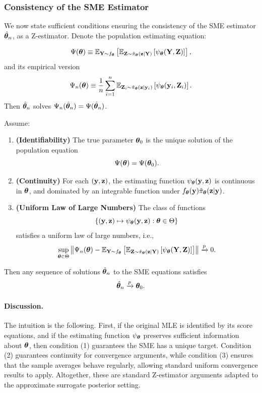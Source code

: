 \documentclass[twoside,11pt]{article}
\begin{document}
{\color{red}
\subsubsection{Consistency of the SME Estimator}

We now state sufficient conditions ensuring the consistency of the SME estimator $\hat{{\bm{\theta}}}_n$, as a Z-estimator. Denote the population estimating equation:

\begin{equation}
    \Psi({\bm{\theta}}) \equiv 
    \mathbb{E}_{{\bf Y} \sim f_{\bm{\theta}}}
    \left[
    \mathbb{E}_{{\bf Z} \sim \tilde\pi_{\bm{\theta}}({\bf z} \mid {\bf Y})}
    \left[
    \psi_{\bm{\theta}}({\bf Y}, {\bf Z})
    \right]
    \right],
\end{equation}
%
and its empirical version
%
\begin{equation}
    \Psi_n({\bm{\theta}}) \equiv 
    \frac{1}{n} \sum_{i=1}^n 
    \mathbb{E}_{{\bf Z}_i \sim \tilde\pi_{\bm{\theta}}({\bf z} \mid {\bf y}_i)}
    \left[
    \psi_{\bm{\theta}}({\bf y}_i, {\bf Z}_i)
    \right].
\end{equation}
%
Then $\hat{{\bm{\theta}}}_n$ solves $\Psi_n(\hat{{\bm{\theta}}}_n) = \Psi(\hat{{\bm{\theta}}}_n)$.

\begin{theorem}
Assume:
\begin{enumerate}
    \item \textbf{(Identifiability)} The true parameter ${\bm{\theta}}_0$ is the unique solution of the population equation
    \[
    \Psi({\bm{\theta}}) = \Psi({\bm{\theta}}_0).
    \]
    \item \textbf{(Continuity)} For each $({\bf y},{\bf z})$, the estimating function $\psi_{\bm{\theta}}({\bf y},{\bf z})$ is continuous in ${\bm{\theta}}$, and dominated by an integrable function under $f_{\bm{\theta}}({\bf y})\tilde\pi_{\bm{\theta}}({\bf z}|{\bf y})$.
    \item \textbf{(Uniform Law of Large Numbers)} The class of functions
    \[
    \left\{
    ({\bf y},{\bf z}) \mapsto \psi_{\bm{\theta}}({\bf y},{\bf z}) 
    : {\bm{\theta}} \in \Theta
    \right\}
    \]
    satisfies a uniform law of large numbers, i.e.,
    \[
    \sup_{{\bm{\theta}} \in \Theta}
    \left\|
    \Psi_n({\bm{\theta}}) - \mathbb{E}_{{\bf Y} \sim f_{\bm{\theta}}}
    \left[
    \mathbb{E}_{{\bf Z} \sim \tilde\pi_{\bm{\theta}}({\bf z} \mid {\bf Y})}
    \left[
    \psi_{\bm{\theta}}({\bf Y}, {\bf Z})
    \right]
    \right]
    \right\| \xrightarrow{p} 0.
    \]
\end{enumerate}
Then any sequence of solutions $\hat{{\bm{\theta}}}_n$ to the SME equations satisfies
\[
\hat{{\bm{\theta}}}_n \xrightarrow{p} {\bm{\theta}}_0.
\]
\end{theorem}

\paragraph{Discussion.}
The intuition is the following. First, if the original MLE is identified by its score equations, and if the estimating function $\psi_{\bm{\theta}}$ preserves sufficient information about ${\bm{\theta}}$, then condition (1) guarantees the SME has a unique target. Condition (2) guarantees continuity for convergence arguments, while condition (3) ensures that the sample averages behave regularly, allowing standard uniform convergence results to apply. Altogether, these are standard Z-estimator arguments adapted to the approximate surrogate posterior setting.

}
\end{document}
